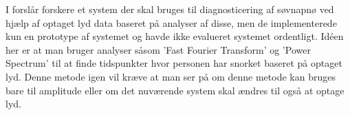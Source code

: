 I \citep{Calabrese20111101} forslår forskere et system der skal bruges til diagnosticering af søvnapnø ved hjælp af optaget lyd data baseret på analyser af disse, men de implementerede kun en prototype af systemet og havde ikke evalueret systemet ordentligt. 
Idéen her er at man bruger analyser såsom 'Fast Fourier Transform' og 'Power Spectrum' til at finde tidspunkter hvor personen har snorket baseret på optaget lyd. 
Denne metode igen vil kræve at man ser på om denne metode kan bruges bare til amplitude eller om det nuværende system skal ændres til også at optage lyd.